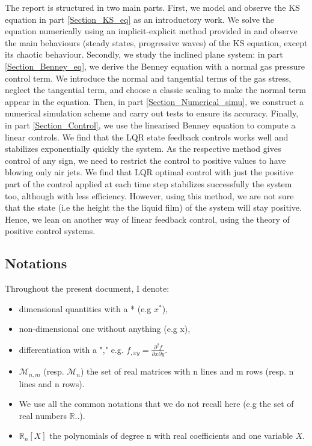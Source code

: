 \documentclass[12pt]{article}
\begin{document}
The report is structured in two main parts. First, we model and observe the KS equation in part \ref{Section_KS_eq} 
as an introductory work. We solve the equation numerically using an implicit-explicit method provided in 
\cite{Scheme_for_KS} and observe the main behaviours (steady states, progressive waves) of the KS equation, except its chaotic 
behaviour. Secondly, we study the inclined plane system: in part \ref{Section_Benney_eq}, we derive the Benney equation with a 
normal gas pressure control term. We introduce the normal and tangential terms of the gas stress, neglect the tangential 
term, and choose a classic scaling to make the normal term appear in the equation.  Then, in part \ref{Section_Numerical_simu}, 
we construct a numerical simulation scheme and carry out tests to ensure its accuracy. Finally, in part \ref{Section_Control}, we 
use the linearised Benney equation to compute a linear controls. We find that the LQR state feedback controls works well and stabilizes
 exponentially quickly the system. As the respective method gives control of any sign, we need to restrict the control to positive values to 
 have blowing only air jets. We find that LQR optimal control with just the positive part of the control applied at each time step stabilizes 
 successfully the system too, although with less efficiency. However, using this method, we are not sure that the state (i.e the height the the 
 liquid film) of the system will stay positive. Hence, we lean on another way of linear feedback control, using the theory of positive control systems. 
\\

\subsection{Notations}
Throughout the present document, I denote: 
\begin{itemize}
    \item dimensional quantities with a * (e.g $x^*$), 
    \item non-dimensional one without anything (e.g x), 
    \item differentiation with a "," e.g. $f_{,xy} = \frac{\partial^2 f}{\partial x\partial y}.$
    \item $\mathcal{M}_{n,m}$ (resp. $\mathcal{M}_n$) the set of real matrices with n lines and m rows (resp. n lines and n rows).
    \item We use all the common notations that we do not recall here (e.g the set of real numbers $\mathbb{R}$..).
    \item $\mathbb{R}_n[X]$ the polynomials of degree n with real coefficients and one variable $X$.
\end{itemize}
\end{document}
